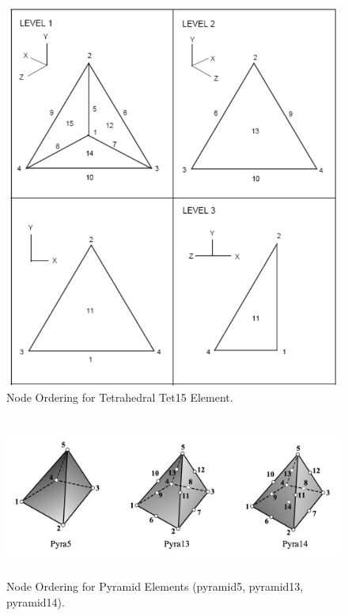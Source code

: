 \begin{figure}
\begin{center}
\includegraphics[width=5.000in, height=5.000in]{topology/tet15.png}
\caption{Node Ordering for Tetrahedral Tet15 Element.}\label{topology:tet15}
\end{center}
\end{figure}

\begin{figure}
\begin{center}
\includegraphics[width=6.000in, height=2.1in]{topology/pyramid.png}
\caption{Node Ordering for Pyramid Elements (pyramid5, pyramid13, pyramid14).}\label{topology:pyramid}
\end{center}
\end{figure}


